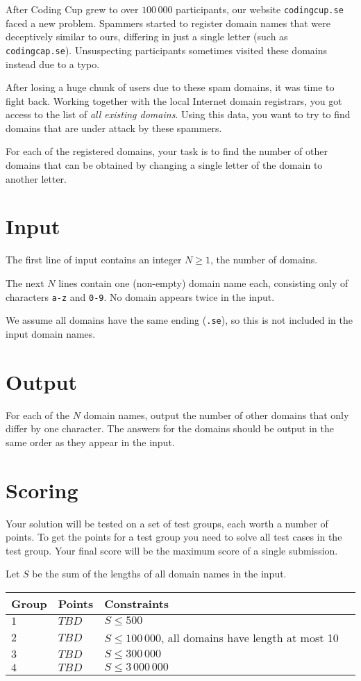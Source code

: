 After Coding Cup grew to over $100\,000$ participants, our website \texttt{codingcup.se} faced a new problem.
Spammers started to register domain names that were deceptively similar to ours, differing in just a single letter (such as \texttt{codingcap.se}).
Unsuspecting participants sometimes visited these domains instead due to a typo.

After losing a huge chunk of users due to these spam domains, it was time to fight back.
Working together with the local Internet domain registrars, you got access to the list of \emph{all existing domains}.
Using this data, you want to try to find domains that are under attack by these spammers.

For each of the registered domains, your task is to find the number of other domains that can be obtained by changing a single letter of the domain to another letter.

\section*{Input}
The first line of input contains an integer $N \ge 1$, the number of domains.

The next $N$ lines contain one (non-empty) domain name each, consisting only of characters \texttt{a-z} and \texttt{0-9}.
No domain appears twice in the input.

We assume all domains have the same ending (\texttt{.se}), so this is not included in the input domain names.

\section*{Output}
For each of the $N$ domain names, output the number of other domains that only differ by one character.
The answers for the domains should be output in the same order as they appear in the input.

\section*{Scoring}
Your solution will be tested on a set of test groups, each worth a number of points.
To get the points for a test group you need to solve all test cases in the test group.
Your final score will be the maximum score of a single submission.

Let $S$ be the sum of the lengths of all domain names in the input.

\noindent
\begin{tabular}{| l | l | l | l |}
\hline
Group & Points & Constraints \\ \hline
$1$    & $TBD$         & $S \le 500$ \\ \hline
$2$    & $TBD$         & $S \le 100\,000$, all domains have length at most 10 \\ \hline
$3$    & $TBD$         & $S \le 300\,000$ \\ \hline
$4$    & $TBD$         & $S \le 3\,000\,000$ \\ \hline
\end{tabular}
